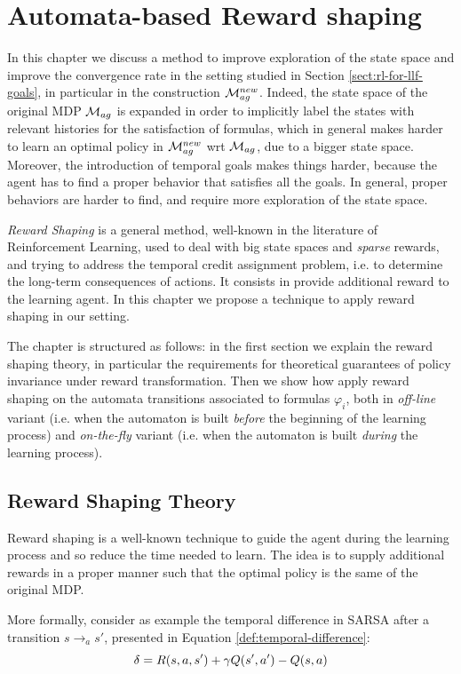 \chapter{Automata-based Reward shaping}
In this chapter we discuss a method to improve exploration of the state space and improve the convergence rate in the setting studied in Section \ref{sect:rl-for-llf-goals}, in particular in the construction $\mathcal{M}_{ag}^{new}$. 
Indeed, the state space of the original MDP $\mathcal{M}_{ag}$ is expanded in order to implicitly label the states with relevant histories for the satisfaction of \LLf formulas, which in general makes harder to learn an optimal policy in $\mathcal{M}_{ag}^{new}$ wrt $\mathcal{M}_{ag}$, due to a bigger state space. 
Moreover, the introduction of temporal goals makes things harder, because the agent has to find a proper behavior that satisfies all the goals. In general, proper behaviors are harder to find, and require more exploration of the state space.

\emph{Reward Shaping} is a general method, well-known in the literature of Reinforcement Learning, used to deal with big state spaces and \emph{sparse} rewards, and trying to address the temporal
credit assignment problem, i.e. to determine
the long-term consequences of actions. It consists in provide additional reward to the learning agent. In this chapter we propose a technique to apply reward shaping in our setting.

The chapter is structured as follows: in the first section we explain the reward shaping theory, in particular the requirements for theoretical guarantees of policy invariance under reward transformation. Then we show how apply reward shaping on the automata transitions associated to \LLf formulas $\varphi_i$, both in \emph{off-line} variant (i.e. when the automaton is built \emph{before} the beginning of the learning process)  and \emph{on-the-fly} variant (i.e. when the automaton is built \emph{during} the learning process).
 
\section{Reward Shaping Theory}
Reward shaping is a well-known technique to guide the agent during the learning process and so reduce the time needed to learn. The idea is to supply additional rewards in a proper manner such that the optimal policy is the same of the original MDP.

More formally, consider as example the temporal difference in SARSA after a transition $s \to_a s'$, presented in Equation \ref{def:temporal-difference}:
\begin{equation}
\delta = R(s,a,s') + \gamma Q(s', a') - Q(s, a)
\end{equation}

